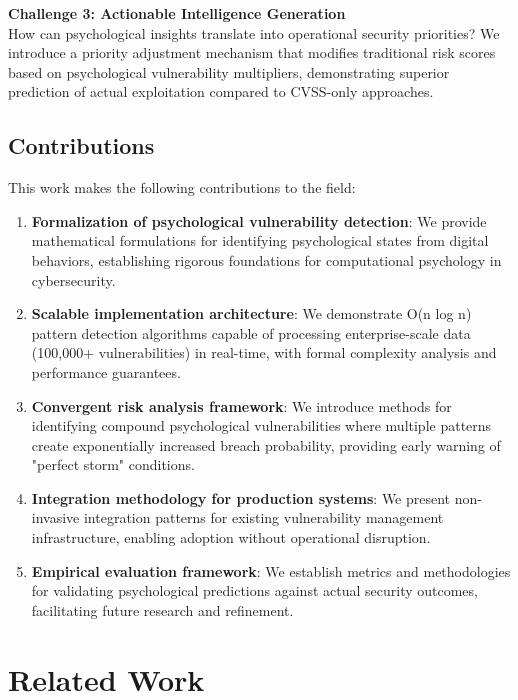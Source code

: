 \documentclass[11pt,a4paper]{article}
\begin{document}
\textbf{Challenge 3: Actionable Intelligence Generation}\\
How can psychological insights translate into operational security priorities? We introduce a priority adjustment mechanism that modifies traditional risk scores based on psychological vulnerability multipliers, demonstrating superior prediction of actual exploitation compared to CVSS-only approaches.

\subsection{Contributions}

This work makes the following contributions to the field:

\begin{enumerate}
\item \textbf{Formalization of psychological vulnerability detection}: We provide mathematical formulations for identifying psychological states from digital behaviors, establishing rigorous foundations for computational psychology in cybersecurity.

\item \textbf{Scalable implementation architecture}: We demonstrate O(n log n) pattern detection algorithms capable of processing enterprise-scale data (100,000+ vulnerabilities) in real-time, with formal complexity analysis and performance guarantees.

\item \textbf{Convergent risk analysis framework}: We introduce methods for identifying compound psychological vulnerabilities where multiple patterns create exponentially increased breach probability, providing early warning of "perfect storm" conditions.

\item \textbf{Integration methodology for production systems}: We present non-invasive integration patterns for existing vulnerability management infrastructure, enabling adoption without operational disruption.

\item \textbf{Empirical evaluation framework}: We establish metrics and methodologies for validating psychological predictions against actual security outcomes, facilitating future research and refinement.
\end{enumerate}

\section{Related Work}
\end{document}
